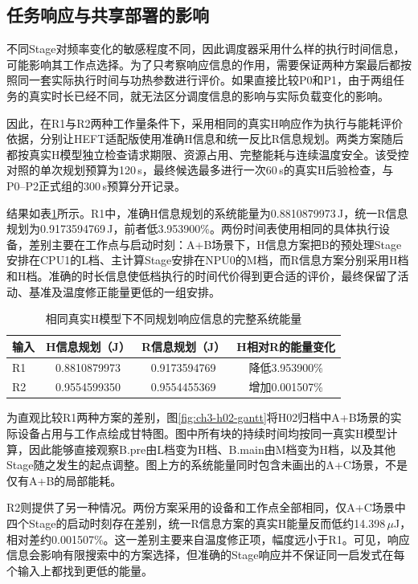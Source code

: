 \subsection{任务响应与共享部署的影响}

不同Stage对频率变化的敏感程度不同，因此调度器采用什么样的执行时间信息，可能影响其工作点选择。为了只考察响应信息的作用，需要保证两种方案最后都按照同一套实际执行时间与功热参数进行评价。如果直接比较P0和P1，由于两组任务的真实时长已经不同，就无法区分调度信息的影响与实际负载变化的影响。

因此，在R1与R2两种工作量条件下，采用相同的真实H响应作为执行与能耗评价依据，分别让HEFT适配版使用准确H信息和统一反比R信息规划。两类方案随后都按真实H模型独立检查请求期限、资源占用、完整能耗与连续温度安全。该受控对照的单次规划预算为120\,s，最终候选最多进行一次60\,s的真实H后验检查，与P0--P2正式组的300\,s预算分开记录。

结果如表\ref{tab:exp-response}所示。R1中，准确H信息规划的系统能量为0.8810879973\,J，统一R信息规划为0.9173594769\,J，前者低3.953900\%。两份时间表使用相同的具体执行设备，差别主要在工作点与启动时刻：A+B场景下，H信息方案把B的预处理Stage安排在CPU1的L档、主计算Stage安排在NPU0的M档，而R信息方案分别采用H档和H档。准确的时长信息使低档执行的时间代价得到更合适的评价，最终保留了活动、基准及温度修正能量更低的一组安排。
\begin{table}[htbp]
\centering
\caption{相同真实H模型下不同规划响应信息的完整系统能量}
\label{tab:exp-response}
\begin{tabular}{lccc}
\toprule
输入 & H信息规划（J） & R信息规划（J） & H相对R的能量变化 \\
\midrule
R1 & 0.8810879973 & 0.9173594769 & 降低3.953900\% \\
R2 & 0.9554599350 & 0.9554455369 & 增加0.001507\% \\
\bottomrule
\end{tabular}
\end{table}

为直观比较R1两种方案的差别，图\ref{fig:ch3-h02-gantt}将H02归档中A+B场景的实际设备占用与工作点绘成甘特图。图中所有块的持续时间均按同一真实H模型计算，因此能够直接观察B.pre由L档变为H档、B.main由M档变为H档，以及其他Stage随之发生的起点调整。图上方的系统能量同时包含未画出的A+C场景，不是仅有A+B的局部能耗。



R2则提供了另一种情况。两份方案采用的设备和工作点全部相同，仅A+C场景中四个Stage的启动时刻存在差别，统一R信息方案的真实H能量反而低约14.398\,$\mu$J，相对差约0.001507\%。这一差别主要来自温度修正项，幅度远小于R1。可见，响应信息会影响有限搜索中的方案选择，但准确的Stage响应并不保证同一启发式在每个输入上都找到更低的能量。


